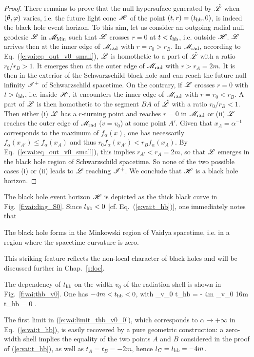 \begin{proof}
There remains to prove that the null hypersuface generated by
$\hat{\mathscr{L}}$ when $(\theta,\varphi)$ varies, i.e. the future light cone $\mathscr{H}$
of the point $(t, r) = (t_{\rm hb}, 0)$, is indeed the black hole event
horizon. To this aim, let us consider an outgoing radial null geodesic $\mathscr{L}$
in $\mathscr{M}_{\rm Min}$ such that $\mathscr{L}$ crosses $r=0$ at $t < t_{\rm hb}$,
i.e. outside $\mathscr{H}$.
$\mathscr{L}$ arrives then at the inner edge of $\mathscr{M}_{\rm rad}$
with $r = r_0 > r_B$.  In $\mathscr{M}_{\rm rad}$,
according to Eq.~(\ref{e:vai:eq_out_v0_small}),
$\mathscr{L}$ is homothetic to a part of $\hat{\mathscr{L}}$ with a ratio $r_0 / r_B > 1$. It emerges
then at the outer edge of $\mathscr{M}_{\rm rad}$ with $r > r_A = 2 m$. It is
then in the exterior of the Schwarzschild black hole and can reach
the future null infinity $\mathscr{I}^+$ of Schwarzschild spacetime.
On the contrary, if $\mathscr{L}$ crosses $r=0$ with $t > t_{\rm hb}$,
i.e. inside $\mathscr{H}$,
it encounters the inner edge of $\mathscr{M}_{\rm rad}$ with
$r = r_0 < r_B$. A part of $\mathscr{L}$ is then homothetic to the segment $BA$ of
$\hat{\mathscr{L}}$ with a ratio $r_0 / r_B < 1$. Then either (i) $\mathscr{L}$ has a
$r$-turning point and reaches $r=0$
in $\mathscr{M}_{\rm rad}$ or (ii) $\mathscr{L}$ reaches
the outer edge of $\mathscr{M}_{\rm rad}$ ($v = v_0$) at some point $A'$.
Given that $x_A = \alpha^{-1}$ corresponds to the maximum of $f_\alpha(x)$, one
has necessarily $f_\alpha(x_{A'}) \leq f_\alpha(x_A)$ and thus
$r_0 f_\alpha(x_{A'}) < r_B f_\alpha(x_A)$. By
Eq.~(\ref{e:vai:eq_out_v0_small}), this implies $r_{A'} < r_A = 2m$, so
that $\mathscr{L}$ emerges in the black hole region of Schwarzschild spacetime.
So none of the two possible cases (i) or (ii) leads to $\mathscr{L}$ reaching
$\mathscr{I}^+$. We conclude that $\mathscr{H}$ is a black hole
horizon.
\end{proof}

The black hole event horizon $\mathscr{H}$ is depicted as the thick black curve
in Fig.~\ref{f:vai:diag_S0}. Since $t_{\rm hb} < 0$ [cf. Eq.~(\ref{e:vai:t_hb})],
one immediately notes that
\begin{greybox}
The black hole forms in the Minkowski
region of Vaidya spacetime, i.e. in a region where the spacetime curvature
is zero.
\end{greybox}
This striking feature reflects the non-local character of black holes and
will be discussed further in Chap.~\ref{s:loc}.

The dependency of $t_{\rm hb}$
on the width $v_0$ of the radiation shell is shown in Fig.~\ref{f:vai:thb_v0}.
One has $-4m < t_{\rm hb} < 0$, with
\be \label{e:vai:limit_thb_v0_0}
    \lim_{v_0 } t_{\rm hb} = - 4m \qand
     \lim_{v_0 \to 16m} t_{\rm hb} = 0 .
\ee
\begin{remark}
The first limit in (\ref{e:vai:limit_thb_v0_0}), which corresponds to $\alpha\to +\infty$ in Eq.~(\ref{e:vai:t_hb}),
is easily recovered by a pure geometric construction: a zero-width
shell implies the equality of the two points $A$ and $B$ considered in the
proof of (\ref{e:vai:t_hb}), as well as $t_A = t_B = - 2m$, hence
$t_C = t_{\rm hb} = - 4 m$.
\end{remark}


